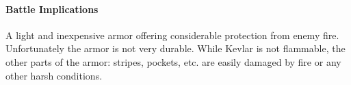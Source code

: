 \paragraph*{Battle Implications}
A light and inexpensive armor offering considerable protection from enemy fire. Unfortunately the armor is not very durable. While Kevlar is not flammable, the other parts of the armor: stripes, pockets, etc. are easily damaged by fire or any other harsh conditions. 
